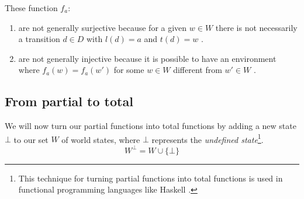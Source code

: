 These function $f_{a}$:
\begin{enumerate}[(1)]
    \item are not generally surjective because for a given $w \in W$ there is not necessarily a transition $d \in D$ with $l(d) = a$ and $t(d) = w$ .

    \item are not generally injective because it is possible to have an environment where $f_{a}(w)=f_{a}(w')$ for some $w \in W$ different from $w' \in W$ .
\end{enumerate}


\subsection{From partial to total}

We will now turn our partial functions into total functions by adding a new state $\bot$ to our set $W$ of world states, where $\bot$ represents the \emph{undefined state}\footnote{
This technique for turning partial functions into total functions is used in functional programming languages like Haskell .
}.
\begin{equation}
    W^{\bot} = W \cup \{ \bot \}
\end{equation}

